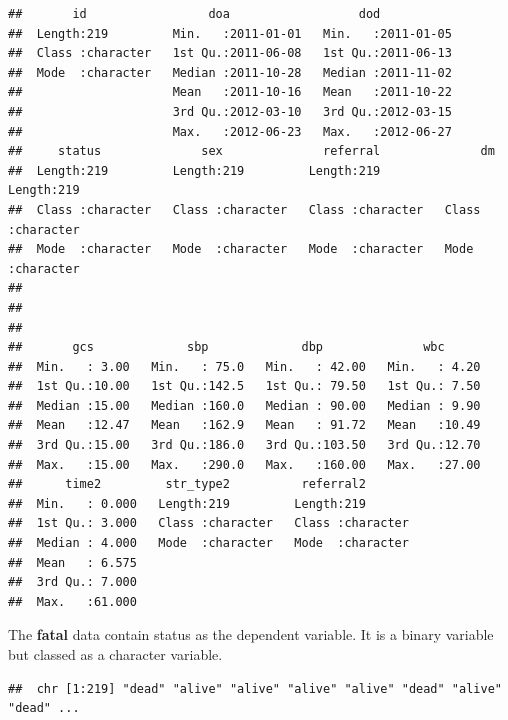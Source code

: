 \documentclass[
]{book}
\makeatletter
\newenvironment{Shaded}{\begin{snugshade}}{\end{snugshade}}
\newcommand{\FunctionTok}[1]{\textcolor[rgb]{0,0,0}{#1}}
\newcommand{\NormalTok}[1]{#1}
\newcommand{\SpecialCharTok}[1]{\textcolor[rgb]{0,0,0}{#1}}
\newenvironment{kframe}{%
\medskip{}
\setlength{\fboxsep}{.8em}
 \def\at@end@of@kframe{}%
 \ifinner\ifhmode%
  \def\at@end@of@kframe{\end{minipage}}%
  \begin{minipage}{\columnwidth}%
 \fi\fi%
 \def\FrameCommand##1{\hskip\@totalleftmargin \hskip-\fboxsep
 \colorbox{shadecolor}{##1}\hskip-\fboxsep
     \hskip-\linewidth \hskip-\@totalleftmargin \hskip\columnwidth}%
 \MakeFramed {\advance\hsize-\width
   \@totalleftmargin\z@ \linewidth\hsize
   \@setminipage}}%
 {\par\unskip\endMakeFramed%
 \at@end@of@kframe}
\renewenvironment{Shaded}{\begin{kframe}}{\end{kframe}}
\makeatother
\begin{document}
\begin{verbatim}
##       id                 doa                  dod            
##  Length:219         Min.   :2011-01-01   Min.   :2011-01-05  
##  Class :character   1st Qu.:2011-06-08   1st Qu.:2011-06-13  
##  Mode  :character   Median :2011-10-28   Median :2011-11-02  
##                     Mean   :2011-10-16   Mean   :2011-10-22  
##                     3rd Qu.:2012-03-10   3rd Qu.:2012-03-15  
##                     Max.   :2012-06-23   Max.   :2012-06-27  
##     status              sex              referral              dm           
##  Length:219         Length:219         Length:219         Length:219        
##  Class :character   Class :character   Class :character   Class :character  
##  Mode  :character   Mode  :character   Mode  :character   Mode  :character  
##                                                                             
##                                                                             
##                                                                             
##       gcs             sbp             dbp              wbc       
##  Min.   : 3.00   Min.   : 75.0   Min.   : 42.00   Min.   : 4.20  
##  1st Qu.:10.00   1st Qu.:142.5   1st Qu.: 79.50   1st Qu.: 7.50  
##  Median :15.00   Median :160.0   Median : 90.00   Median : 9.90  
##  Mean   :12.47   Mean   :162.9   Mean   : 91.72   Mean   :10.49  
##  3rd Qu.:15.00   3rd Qu.:186.0   3rd Qu.:103.50   3rd Qu.:12.70  
##  Max.   :15.00   Max.   :290.0   Max.   :160.00   Max.   :27.00  
##      time2         str_type2          referral2        
##  Min.   : 0.000   Length:219         Length:219        
##  1st Qu.: 3.000   Class :character   Class :character  
##  Median : 4.000   Mode  :character   Mode  :character  
##  Mean   : 6.575                                        
##  3rd Qu.: 7.000                                        
##  Max.   :61.000
\end{verbatim}

The \textbf{fatal} data contain status as the dependent variable. It is a binary variable but classed as a character variable.

\begin{Shaded}
\end{Shaded}

\begin{verbatim}
##  chr [1:219] "dead" "alive" "alive" "alive" "alive" "dead" "alive" "dead" ...
\end{verbatim}
\end{document}
